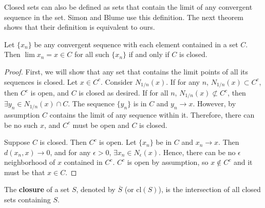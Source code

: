 Closed sets can also be defined as sets that contain the limit of any
convergent sequence in the set. Simon and Blume use this
definition. The next theorem shows that their definition is equivalent
to ours.
\begin{theorem}\label{thm:clim}
  Let $\{x_n\}$ be any convergent sequence with each element contained
  in a set $C$. Then $\lim x_n = x \in C$ for all such $\{x_n\}$ if
  and only if $C$ is closed.
\end{theorem}
\begin{proof}
  First, we will show that any set that contains the limit points of
  all its sequences is closed. Let $x \in C^c$. Consider
  $N_{1/n}(x)$. If for any $n$, $N_{1/n}(x) \subset C^c$, then $C^c$
  is open, and $C$ is closed as desired. If for all $n$, $N_{1/n}(x)
  \not \subset C^c$, then $\exists y_n \in N_{1/n}(x) \cap C$. The
  sequence $\{y_n\}$ is in $C$ and $y_n \to x$. However, by assumption
  $C$ contains the limit of any sequence within it. Therefore, there
  can be no such $x$, and $C^c$ must be open and $C$ is closed.

  Suppose $C$ is closed. Then $C^c$ is open. Let $\{x_n\}$ be in $C$
  and $x_n \to x$. Then $d(x_n, x) \to 0$, and for any $\epsilon > 0$,
  $\exists x_n \in N_\epsilon(x)$. Hence, there can be no $\epsilon$
  neighborhood of $x$ contained in $C^c$. $C^c$ is open by assumption,
  so $x \not\in C^c$ and it must be that $x \in C$. 
\end{proof}

\begin{definition}
  The \textbf{closure} of a set $S$, denoted by $\overline{S}$ (or
  $\mathrm{cl}(S)$), is the intersection of all closed sets containing $S$.
\end{definition}

